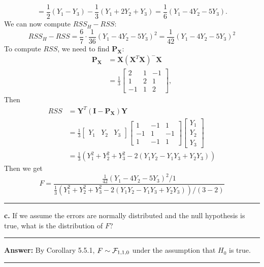 \documentclass[
]{article}
\newcommand{\bmI}{\ensuremath{\bm I}}
\newcommand{\bmP}{\ensuremath{\bm P}}
\newcommand{\bmX}{\ensuremath{\bm X}}
\newcommand{\bmY}{\ensuremath{\bm Y}}
\begin{document}
\[= \frac{1}{2}(Y_1 - Y_3) - \frac{1}{3}(Y_1 + 2Y_2 + Y_3)
= \frac{1}{6}(Y_1 - 4Y_2 - 5Y_3).
\] We can now compute \(RSS_H - RSS\): \[
RSS_H - RSS = \frac{6}{7}\cdot\frac{1}{36}(Y_1 - 4Y_2 - 5Y_3)^2 = \frac{1}{42} (Y_1 - 4Y_2 - 5Y_3)^2
\] To compute \(RSS\), we need to find \(\bmP_{\bmX}\): \begin{align*}
\bmP_{\bmX} &= \bmX(\bmX^T\bmX)^-\bmX \\
&= \frac{1}{3} 
\begin{bmatrix} 
2 & 1 & -1 \\
1 & 2 & 1 \\
-1 & 1 & 2
\end{bmatrix},
\end{align*} Then \begin{align*}
RSS &= \bmY^T(\bmI - \bmP_{\bmX})\bmY \\
&= \frac{1}{3}
\begin{bmatrix} Y_1 & Y_2 & Y_3 \end{bmatrix}
\begin{bmatrix}
1 & -1 & 1 \\
-1 & 1 & -1 \\
1 & -1 & 1
\end{bmatrix}
\begin{bmatrix} Y_1 \\ Y_2 \\ Y_3 \end{bmatrix} \\
&= \frac{1}{3}\left( Y_1^2 + Y_2^2 + Y_3^2 -2(Y_1Y_2 - Y_1Y_3 + Y_2Y_3) \right)
\end{align*} Then we get \[
F = \frac{\frac{1}{42} (Y_1 - 4Y_2 - 5Y_3)^2/1}{\frac{1}{3}\left( Y_1^2 + Y_2^2 + Y_3^2 -2(Y_1Y_2 - Y_1Y_3 + Y_2Y_3) \right)/(3-2)}
\]

\begin{center}\rule{0.5\linewidth}{0.5pt}\end{center}

\textbf{c.} If we assume the errors are normally distributed and the
null hypothesis is true, what is the distribution of \(F\)?

\begin{center}\rule{0.5\linewidth}{0.5pt}\end{center}

\textbf{Answer:} By Corollary 5.5.1, \(F \sim {\cal F}_{1,1,0}\) under
the assumption that \(H_0\) is true.

\begin{center}\rule{0.5\linewidth}{0.5pt}\end{center}
\end{document}
